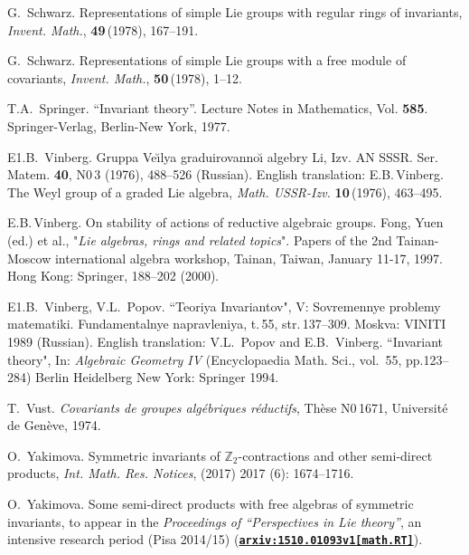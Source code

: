 \begin{thebibliography}{Pa95}
 {\sc G.~Schwarz}. Representations of simple Lie groups with regular
rings of invariants, {\it Invent. Math.}, {\bf 49}\,(1978), 167--191.

 {\sc G.~Schwarz}. Representations of simple Lie groups with a free module of covariants, 
{\it Invent. Math.}, {\bf 50}\,(1978), 1--12.

{\sc T.A.~Springer}.
``Invariant theory''. Lecture Notes in Mathematics, Vol. {\bf 585}. 
Springer-Verlag, Berlin-New York, 1977. 

{{\tencysc\cyracc} {E1}.B.~Vinberg}. {{\tencyr\cyracc} Gruppa Ve\u\i lya 
graduirovanno{\u\i} algebry Li}, {{\tencyi\cyracc} Izv. AN SSSR. Ser. Matem.} 
{\bf 40}, {{\tencyr\cyracc} N0}\,3 (1976), 488--526 (Russian). English translation: 
{\sc E.B.\,Vinberg}. The Weyl group of a graded Lie algebra,
{\it Math. USSR-Izv.} {\bf 10}\,(1976), 463--495.

 {\sc E.B.\,Vinberg}. 
On stability of actions of reductive algebraic groups. 
Fong, Yuen (ed.) et al., "{\it Lie algebras, rings and related topics}". Papers of 
the 2nd Tainan-Moscow international algebra workshop, Tainan, Taiwan,
January 11-17, 1997. Hong Kong: Springer, 188--202 (2000).

{{\tencysc\cyracc} {E1}.B.~Vinberg, V.L.~Popov}. {{\tencyi\cyracc} ``Teoriya Invariantov"}, {{\tencyr\cyracc} V:  
Sovremennye problemy matematiki. Fundamental{\cprime}nye napravleniya, t.\,55,
str.}\,137--309. {{\tencyr\cyracc} Moskva: VINITI} 1989 (Russian).
English translation: 
{\sc V.L.~Popov} and {\sc E.B.~Vinberg}. ``Invariant theory", In: {\it  Algebraic Geometry IV}
(Encyclopaedia Math. Sci., vol.~55, pp.123--284) 
Berlin Heidelberg New York: Springer 1994.

 {\sc T.~Vust}. {\it Covariants de groupes alg\'ebriques r\'eductifs}, 
Th\`ese {{\tencyr\cyracc} N0}\,1671, Universit\'e de Gen\`eve, 1974. 

{\sc O.~Yakimova.} Symmetric invariants of $\mathbb Z_2$-contractions and other semi-direct products, 
{\it Int.  Math. Res. Notices}, (2017) 2017 (6): 1674--1716.

{\sc O.~Yakimova.} Some semi-direct products with free algebras of symmetric invariants,
to appear in the {\it Proceedings of ``Perspectives in Lie theory''}, an intensive research period (Pisa 2014/15)  (\href{http://front.math.ucdavis.edu/1510.01093}{\tt \bfseries arxiv:1510.01093v1[math.RT]}).
\end{thebibliography}




